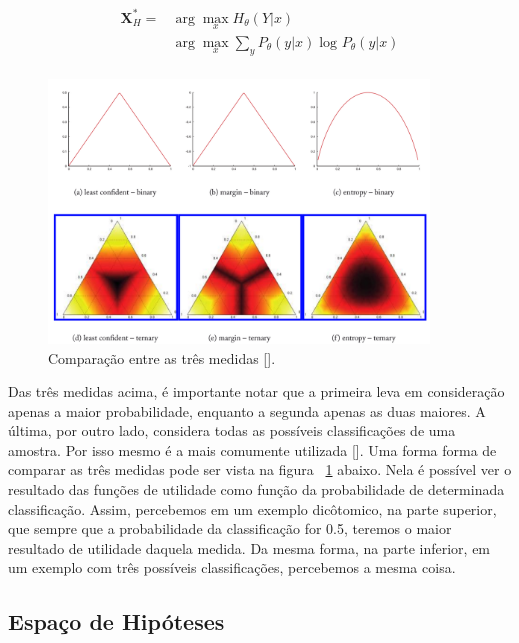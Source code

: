 \begin{align*}
\textbf{X}^*_{H} = &\arg\max_{x} H_{\theta}  (Y\lvert x)\\
&\arg\max_{x} \sum_{y} P_{\theta}  (y\lvert x) \log_{} P_{\theta}  (y\lvert x)\\
\end{align*}





\begin{figure}
  \centering
  \includegraphics[width=0.9\textwidth]{figures/settles_2014_uncertainty_medidas.png}
  \caption{Comparação entre as três medidas [\cite{settles2014active}].}
  \label{fig:settles_2014_uncertainty_medidas}
\end{figure}



Das três medidas acima, é importante notar que a primeira leva em consideração apenas a maior probabilidade, enquanto a segunda apenas as duas maiores. A última, por outro lado, considera todas as possíveis classificações de uma amostra. Por isso mesmo é a mais comumente utilizada [\cite{settles2014active}]. Uma forma forma de comparar as três medidas pode ser vista na figura ~\ref{fig:settles_2014_uncertainty_medidas} abaixo. Nela é possível ver o resultado das funções de utilidade como função da probabilidade de determinada classificação. Assim, percebemos em um exemplo dicôtomico, na parte superior, que sempre que a probabilidade da classificação for 0.5, teremos o maior resultado de utilidade daquela medida. Da mesma forma, na parte inferior, em um exemplo com três possíveis classificações, percebemos a mesma coisa. 


\subsection{Espaço de Hipóteses} 
\label{sec:hypothesis_space}

